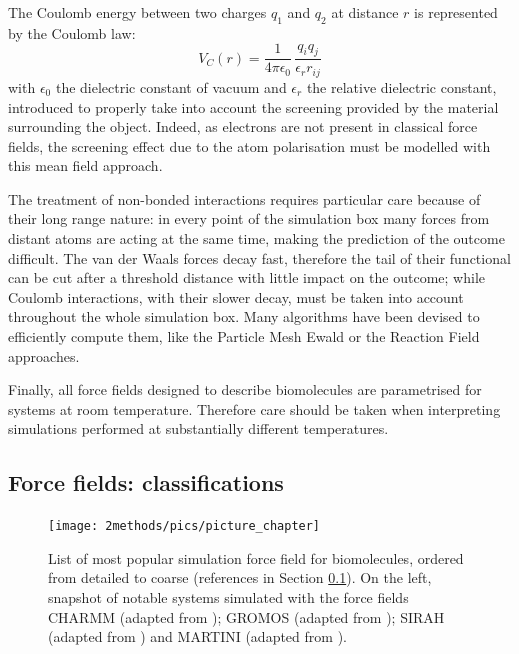 The Coulomb energy between two charges $q_1$ and $q_2$ at distance $r$ is represented by the Coulomb law:
\begin{equation}
V_C(r) = \frac{1}{4 \pi \epsilon_0} \, \frac{q_i q_j}{\epsilon_r r_{ij}}
\end{equation}
with $\epsilon_0$ the dielectric constant of vacuum and $\epsilon_r$ the relative dielectric constant, introduced to properly take into account the screening provided by the material surrounding the object. Indeed, as electrons are not present in classical force fields, the screening effect due to the atom polarisation must be modelled with this mean field approach.

The treatment of non-bonded interactions requires particular care because of their long range nature: in every point of the simulation box many forces from distant atoms are acting at the same time, making the prediction of the outcome difficult.
%
The van der Waals forces decay fast, therefore the tail of their functional can be cut after a threshold distance with little impact on the outcome; while Coulomb interactions, with their slower decay, must be taken into account throughout the whole simulation box. Many algorithms have been devised to efficiently compute them, like the Particle Mesh Ewald \citep{Essmann1995} or the Reaction Field \citep{Tironi1995} approaches.

Finally, all force fields designed to describe biomolecules are parametrised for systems at room temperature. Therefore care should be taken when interpreting simulations performed at substantially different temperatures.


\subsection{Force fields: classifications} \label{sec:ff_ex}

\begin{figure}[p!]
\centering
\texttt{[image: 2methods/pics/picture\_chapter]}
%
\caption[MD force field classifications]{List of most popular simulation force field for biomolecules, ordered from detailed to coarse (references in Section \ref{sec:ff_ex}). On the left, snapshot of notable systems simulated with the force fields CHARMM (adapted from \citet{Lipkin2017}); GROMOS (adapted from \citet{Macpherson2019}); SIRAH (adapted from \citet{Machado2017}) and MARTINI (adapted from \citet{Samsudin2017}).}
\label{fig:ff}
\end{figure}

